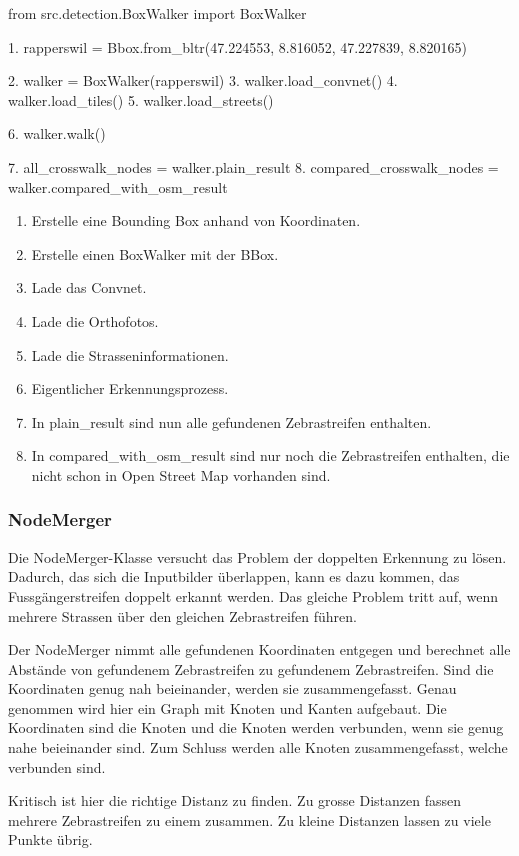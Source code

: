 \begin{python}
	from src.detection.BoxWalker import BoxWalker
	
	1. rapperswil = Bbox.from_bltr(47.224553, 8.816052, 47.227839, 8.820165)
	
	2. walker = BoxWalker(rapperswil)
	3. walker.load_convnet()
	4. walker.load_tiles()
	5. walker.load_streets()
	
	6. walker.walk()
	
	7. all_crosswalk_nodes = walker.plain_result
	8. compared_crosswalk_nodes = walker.compared_with_osm_result
\end{python}
\begin{enumerate}
	\item Erstelle eine Bounding Box anhand von Koordinaten.
	\item Erstelle einen BoxWalker mit der BBox.
	\item Lade das Convnet.
	\item Lade die Orthofotos.
	\item Lade die Strasseninformationen.
	\item Eigentlicher Erkennungsprozess.
	\item In plain\_result sind nun alle gefundenen Zebrastreifen enthalten.
	\item In compared\_with\_osm\_result sind nur noch die Zebrastreifen enthalten, die nicht schon in Open Street Map vorhanden sind.
\end{enumerate}

\subsubsection{NodeMerger}
Die NodeMerger-Klasse versucht das Problem der doppelten Erkennung zu lösen. Dadurch, das sich die Inputbilder überlappen, kann es dazu kommen, das Fussgängerstreifen doppelt erkannt werden. Das gleiche Problem tritt auf, wenn mehrere Strassen über den gleichen Zebrastreifen führen.

Der NodeMerger nimmt alle gefundenen Koordinaten entgegen und berechnet alle Abstände von gefundenem Zebrastreifen zu gefundenem Zebrastreifen. Sind die Koordinaten genug nah beieinander, werden sie zusammengefasst. Genau genommen wird hier ein Graph mit Knoten und Kanten aufgebaut. Die Koordinaten sind die Knoten und die Knoten werden verbunden, wenn sie genug nahe beieinander sind. Zum Schluss werden alle Knoten zusammengefasst, welche verbunden sind.

Kritisch ist hier die richtige Distanz zu finden. Zu grosse Distanzen fassen mehrere Zebrastreifen zu einem zusammen. Zu kleine Distanzen lassen zu viele Punkte übrig.

